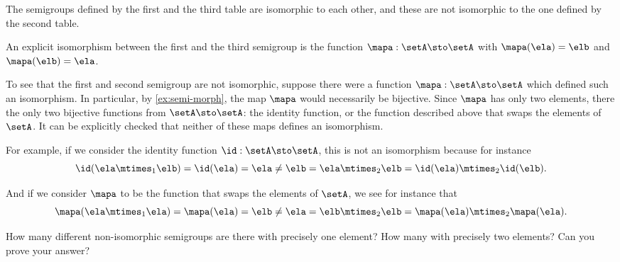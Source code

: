 \begin{solution}
The semigroups defined by the first and the third table are isomorphic to each other, and these are not isomorphic to the one defined by the second table.

An explicit isomorphism between the first and the third semigroup is the function $\mapa : \setA \sto \setA$ with $\mapa(\ela) = \elb$ and $\mapa(\elb)=\ela$.

To see that the first and second semigroup are not isomorphic, suppose there were a function $\mapa : \setA \sto \setA$ which defined such an isomorphism. In particular, by \cref{ex:semi-morph}, the map $\mapa$ would necessarily be bijective. Since $\mapa$ has only two elements, there the only two bijective functions from $ \setA \sto \setA$: the identity function, or the function described above that swaps the elements of $\setA$. It can be explicitly checked that neither of these maps defines an isomorphism.

For example, if we consider the identity function $\id : \setA \sto \setA$, this is not an isomorphism because for instance
$$\id( \ela \mtimes_1 \elb) = \id (\ela) = \ela \neq \elb = \ela \mtimes_2 \elb = \id( \ela) \mtimes_2 \id (\elb).$$

And if we consider $\mapa$ to be the function that swaps the elements of $\setA$, we see for instance that
$$\mapa( \ela \mtimes_1 \ela) = \mapa (\ela) = \elb \neq \ela = \elb \mtimes_2 \elb = \mapa ( \ela) \mtimes_2 \mapa (\ela).$$
\end{solution}

\begin{gradedexercise}
  \label{ex:non-isomorphic}
  How many different non-isomorphic semigroups are there with precisely one element?
  How many with precisely two elements? Can you prove your answer?
\end{gradedexercise}


